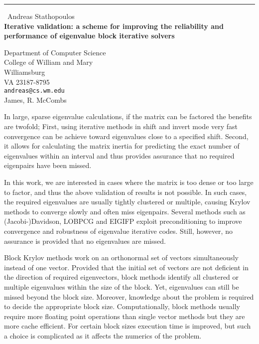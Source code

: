 \documentclass{report}
\begin{document}
\begin{center}
\rule{6in}{1pt} \
{\large Andreas Stathopoulos \\
{\bf Iterative validation: a scheme for improving the reliability and performance of eigenvalue block iterative solvers}}

Department of Computer Science  \\           College of William and Mary \\ Williamsburg \\ VA 23187-8795
\\
{\tt andreas@cs.wm.edu}\\
James, R. McCombs\end{center}

In large, sparse eigenvalue calculations,
if the matrix can be factored the benefits are twofold;
First, using iterative methods in shift and invert mode very fast
convergence can be achieve toward eigenvalues close to a specified shift.
Second, it allows for calculating the matrix inertia
for predicting the exact number of eigenvalues within an interval
and thus provides assurance that no required eigenpairs have been missed.

In this work, we are interested in cases where the matrix is too dense
or too large to factor, and thus the above validation of results is
not possible.
In such cases, the required eigenvalues are usually
tightly clustered or multiple, causing Krylov methods to converge
slowly and often miss eigenpairs.
Several methods such as (Jacobi-)Davidson, LOBPCG and EIGIFP
exploit preconditioning to improve convergence and robustness of
eigenvalue iterative codes.
Still, however, no assurance is provided that no eigenvalues are missed.

Block Krylov methods work on an orthonormal set of vectors simultaneously
instead of one vector.
Provided that the initial set of vectors are not deficient in the direction
of required eigenvectors, block methods identify all clustered or
multiple eigenvalues within the size of the block.
Yet, eigenvalues can still be missed beyond the block size.
Moreover, knowledge about the problem is required to decide the
appropriate block size.
Computationally, block methods usually require more floating point
operations than single vector methods but they are more cache efficient.
For certain block sizes execution time is improved, but such
a choice is complicated as it affects the numerics of the problem.
\end{document}

